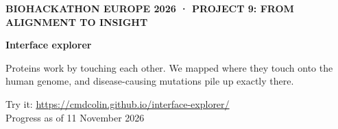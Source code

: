 \documentclass[10pt,aspectratio=169]{beamer}
\begin{document}
\begin{frame}[plain]
  \vspace{6mm}
  {\scriptsize\bfseries\color{accent}BIOHACKATHON EUROPE 2026 · PROJECT 9: FROM ALIGNMENT TO INSIGHT\par}
  \vspace{3mm}
  {\huge\bfseries Interface explorer\par}
  \vspace{4mm}
  \begin{minipage}{128mm}
    \raggedright\Large
    Proteins work by touching each other. We mapped where they touch onto the
    human genome, and disease-causing mutations pile up exactly there.
  \end{minipage}

  \vspace{8mm}
  {\small\color{mute}Try it: \url{https://cmdcolin.github.io/interface-explorer/}\\
  Progress as of 11 November 2026\par}
\end{frame}
\end{document}
